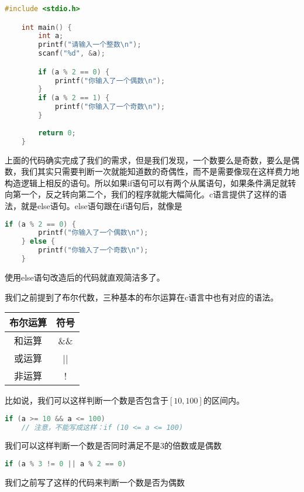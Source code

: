 \begin{lstlisting}[language=C]
    #include <stdio.h>

    int main() {
        int a;
        printf("请输入一个整数\n");
        scanf("%d", &a);

        if (a % 2 == 0) {
            printf("你输入了一个偶数\n");
        }
        if (a % 2 == 1) {
            printf("你输入了一个奇数\n");
        }
        
        return 0;
    }
\end{lstlisting}

上面的代码确实完成了我们的需求，但是我们发现，一个数要么是奇数，要么是偶数，我们其实只需要判断一次就能知道数的奇偶性，而不是需要像现在这样费力地构造逻辑上相反的语句。所以如果if语句可以有两个从属语句，如果条件满足就转向第一个，反之转向第二个，我们的程序就能大幅简化。c语言提供了这样的语法，就是else语句。else语句跟在if语句后，就像是

\begin{lstlisting}[language=C]
    if (a % 2 == 0) {
        printf("你输入了一个偶数\n");
    } else {
        printf("你输入了一个奇数\n");
    }
\end{lstlisting}

使用else语句改造后的代码就直观简洁多了。

我们之前提到了布尔代数，三种基本的布尔运算在c语言中也有对应的语法。

\begin{longtable}{c|c}
    布尔运算 & 符号\\
    \hline
    和运算 & \&\&\\
    \hline
    或运算 & ||\\
    \hline
    非运算 & !\\ 
\end{longtable}

比如说，我们可以这样判断一个数是否包含于$[10, 100]$的区间内。

\begin{lstlisting}[language=C]
    if (a >= 10 && a <= 100)
    // 注意，不能写成这样：if (10 <= a <= 100)
\end{lstlisting}

我们可以这样判断一个数是否同时满足不是3的倍数或是偶数

\begin{lstlisting}[language=C]
    if (a % 3 != 0 || a % 2 == 0)
\end{lstlisting}

我们之前写了这样的代码来判断一个数是否为偶数

